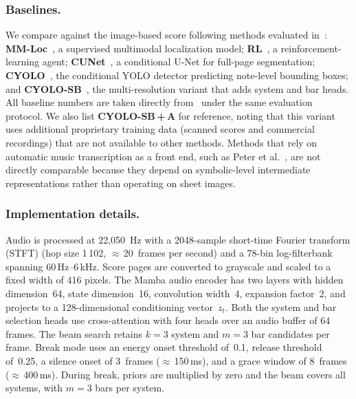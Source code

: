 \documentclass{article}
\begin{document}
\subsubsection{Baselines.}
We compare against the image-based score following methods evaluated
in~\cite{henkel2021real}: \textbf{MM-Loc}~\cite{dorfer2016towards}, a
supervised multimodal localization model; \textbf{RL}~\cite{henkel2019score},
a reinforcement-learning agent; \textbf{CUNet}~\cite{henkel2020learning}, a
conditional U-Net for full-page segmentation; \textbf{CYOLO}~\cite{henkel2021multi}, the conditional
YOLO detector predicting note-level bounding boxes; and \textbf{CYOLO-SB}~\cite{henkel2021real}, the multi-resolution variant that adds system and bar heads. All baseline numbers are taken directly from~\cite{henkel2021real} under the same evaluation protocol. We also list \textbf{CYOLO-SB\,+\,A} for reference, noting that this variant uses additional proprietary training data (scanned scores and commercial recordings) that are not available to other methods. Methods that rely on automatic music transcription as a front end, such as Peter et al.~\cite{peter2025pairing}, are not directly comparable because they depend on symbolic-level intermediate representations rather than operating on sheet images.
 
\subsubsection{Implementation details.}
Audio is processed at 22,050~Hz with a 2048-sample short-time Fourier transform (STFT) (hop size 1\,102,
${\approx}\,$20~frames per second) and a 78-bin log-filterbank spanning
60\,Hz--6\,kHz. Score pages are converted to grayscale and scaled to a fixed
width of 416 pixels. The Mamba audio encoder has two layers with hidden
dimension~64, state dimension~16, convolution width~4, expansion factor~2, and projects to a 128-dimensional conditioning vector~$z_t$. Both the system and bar selection heads use cross-attention with four heads over an audio buffer of 64 frames. The beam search retains $k{=}3$ system and $m{=}3$ bar candidates per frame. Break mode uses an energy onset threshold of~0.1, release threshold of~0.25, a silence onset of 3~frames (${\approx}\,$150\,ms), and a grace window of 8~frames (${\approx}\,$400\,ms). During break, priors are multiplied by zero and the beam covers all systems, with $m{=}3$ bars per system.
 
\end{document}
